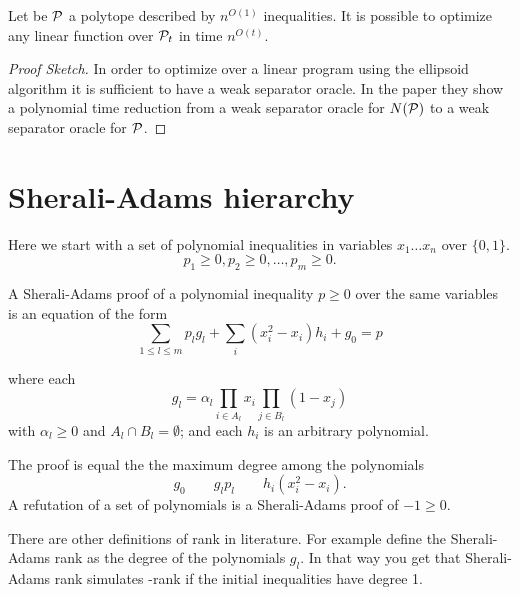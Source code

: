 \documentclass[a4paper,twoside,justified]{tufte-handout}
\begin{document}
\pagebreak

\begin{theorem}\cite{lovasz1991cones}
  Let be $\mathcal{P}$ a polytope described by $ n^{O(1)} $
  inequalities. It is possible to optimize any linear function over $
  \mathcal{P}_{t} $ in time $ n^{O(t)} $.
\end{theorem}
\begin{proof}[Proof Sketch]
  In order to optimize over a linear program using the ellipsoid
  algorithm it is sufficient to have a weak separator oracle. In the
  paper they show a polynomial time reduction from a weak separator
  oracle for $ N(\mathcal{P}) $ to a weak separator oracle for $\mathcal{P}$.
\end{proof}

\section{Sherali-Adams hierarchy}

Here we start with a set of polynomial inequalities in variables $
x_{1}\ldots x_{n} $ over $ \{0,1\} $.
\begin{equation}
  p_{1}\geq 0 , p_{2}\geq 0, \ldots , p_{m} \geq 0. 
\end{equation}

A Sherali-Adams proof of a polynomial inequality $p\geq 0$ over the
same variables is an equation of the form
\begin{equation}
 \label{eq:sa_inference}
 \sum_{1\leq l\leq m} p_{l} g_{l} + \sum_{i} (x^{2}_{i} -x_{i}) h_{i}
 + g_{0}= p
\end{equation}

where each 
\begin{equation}
  g_{l} = \alpha_{l} \prod_{i\in A_{l}} x_{i} \prod_{j \in
    B_{l}}(1-x_{j})  
\end{equation}
with $ \alpha_{l}\geq 0 $ and $ A_{l} \cap B_{l}=\emptyset $; and each
$ h_{i} $ is an arbitrary polynomial.

The 
proof is equal the the maximum degree among the polynomials 
\begin{equation}
g_{0} \qquad g_{l}p_{l} \qquad h_{i}(x^{2}_{i}- x_{i}).  
\end{equation}
%
A refutation of a set of polynomials is a Sherali-Adams proof of $ -1
\geq 0 $.

There are other definitions of rank in literature. For
example\cite{laurent01} define the Sherali-Adams rank as the degree of
the polynomials $ g_{l} $. In that way you get that Sherali-Adams rank
simulates \Lovasz-\Schrijver rank if the initial inequalities have
degree 1.
\end{document}
